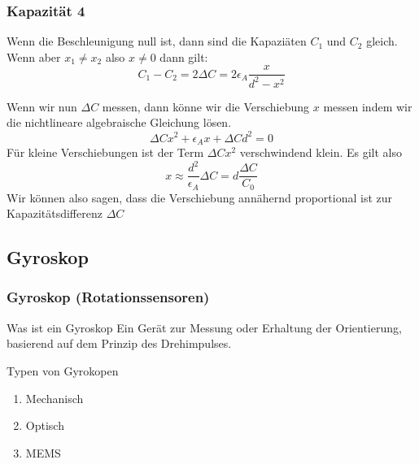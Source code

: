 \documentclass[10pt,a4paper,oneside]{beamer}
\begin{document}
\begin{frame}
	\frametitle{Kapazität 4}
	
	Wenn die Beschleunigung null ist, dann sind die Kapaziäten $C_{1}$ und $C_{2}$ gleich.
	Wenn aber $x_{1} \neq x_{2}$ also $x \neq 0$ dann gilt:
	\begin{equation}
	C_{1} - C_{2} = 2 \Delta C = 2 \epsilon_{A} \frac{x}{d^{2}-x^{2}}
	\end{equation}
	
	Wenn wir nun $\Delta C$ messen, dann könne wir die Verschiebung $x$ messen indem wir die nichtlineare algebraische Gleichung lösen.
	\begin{equation}
	\Delta C x^{2} + \epsilon_{A} x + \Delta C d^{2} = 0
	\end{equation}
	Für kleine Verschiebungen ist der Term $\Delta C x^{2}$ verschwindend klein. Es gilt also
	\begin{equation}
	x \approx \frac{d^{2}}{\epsilon_{A}} \Delta C = d \frac{\Delta C}{C_{0}}
	\end{equation}
	Wir können also sagen, dass die Verschiebung annähernd proportional ist zur Kapazitätsdifferenz $\Delta C$
\end{frame}

\begin{frame}
  \subsection{Gyroskop}
  \frametitle{Gyroskop (Rotationssensoren)}
  
  \begin{block}{Was ist ein Gyroskop}
  Ein Gerät zur Messung oder Erhaltung der Orientierung, basierend auf dem Prinzip des Drehimpulses.
  \end{block}
  \bigskip
  Typen von Gyrokopen
  \begin{enumerate}
  	\item Mechanisch
  	\item Optisch 
  	\item MEMS
  \end{enumerate}
\end{frame}
\end{document}
